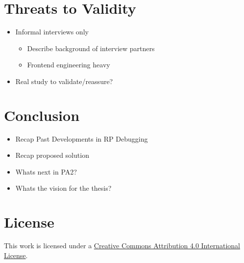 \documentclass[12pt,a4paper]{article}
\begin{document}
\section{Threats to Validity}
\begin{itemize}
	\item Informal interviews only
	\begin{itemize}
		\item Describe background of interview partners
		\item Frontend engineering heavy
	\end{itemize}
	\item Real study to validate/reassure?
\end{itemize}

\section{Conclusion}
\begin{itemize}
	\item Recap Past Developments in RP Debugging
	\item Recap proposed solution
	\item Whats next in PA2?
	\item Whats the vision for the thesis?
\end{itemize}







\section*{License}
\ccby\thinspace\thinspace This work is licensed under a \href{https://creativecommons.org/licenses/by/4.0/}{Creative Commons Attribution 4.0 International License}.
\end{document}
